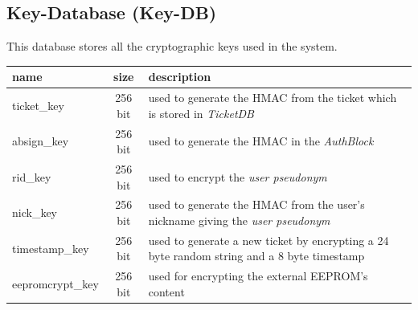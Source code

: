 \subsection{Key-Database (Key-DB)}
This database stores all the cryptographic keys used in the system.\\
\begin{tabular}{|l|c|p{3.8cm}|} \hline
name & size & description \\ \hline 
ticket\_key            & 256 bit & used to generate the HMAC from the ticket which is stored in \textit{TicketDB} \\
absign\_key      & 256 bit & used to generate the HMAC in the \textit{AuthBlock} \\
rid\_key         & 256 bit & used to encrypt the \textit{user pseudonym} \\
nick\_key        & 256 bit & used to generate the HMAC from the user's nickname giving the \textit{user pseudonym} \\
timestamp\_key   & 256 bit & used to generate a new ticket by encrypting a 24 byte random string and a 8 byte timestamp \\
eepromcrypt\_key & 256 bit & used for encrypting the external EEPROM's content \\
\hline
\end{tabular}
